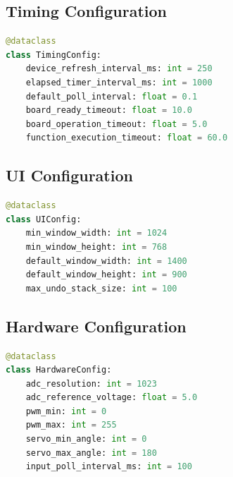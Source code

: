 \documentclass[11pt,a4paper]{article}
\begin{document}
\subsection{Timing Configuration}

\begin{lstlisting}[language=Python]
@dataclass
class TimingConfig:
    device_refresh_interval_ms: int = 250
    elapsed_timer_interval_ms: int = 1000
    default_poll_interval: float = 0.1
    board_ready_timeout: float = 10.0
    board_operation_timeout: float = 5.0
    function_execution_timeout: float = 60.0
\end{lstlisting}

\subsection{UI Configuration}

\begin{lstlisting}[language=Python]
@dataclass
class UIConfig:
    min_window_width: int = 1024
    min_window_height: int = 768
    default_window_width: int = 1400
    default_window_height: int = 900
    max_undo_stack_size: int = 100
\end{lstlisting}

\subsection{Hardware Configuration}

\begin{lstlisting}[language=Python]
@dataclass
class HardwareConfig:
    adc_resolution: int = 1023
    adc_reference_voltage: float = 5.0
    pwm_min: int = 0
    pwm_max: int = 255
    servo_min_angle: int = 0
    servo_max_angle: int = 180
    input_poll_interval_ms: int = 100
\end{lstlisting}
\end{document}
